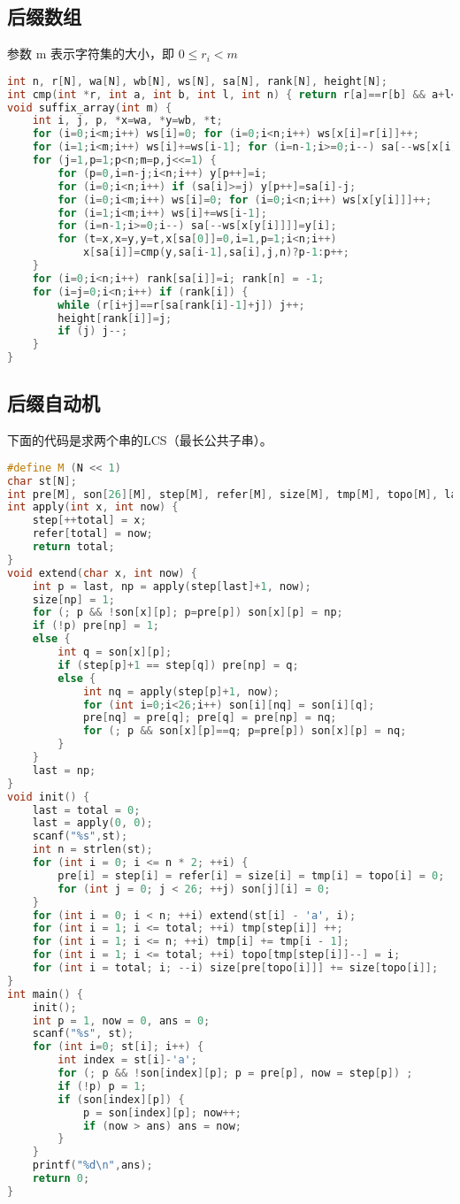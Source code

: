 \documentclass[landscape,a4paper]{article}
\begin{document}
\subsection{后缀数组}
参数 m 表示字符集的大小，即 $0 \leq r_i < m$ 
\begin{lstlisting}[language=C++]
int n, r[N], wa[N], wb[N], ws[N], sa[N], rank[N], height[N];
int cmp(int *r, int a, int b, int l, int n) { return r[a]==r[b] && a+l<n && b+l<n && r[a+l]==r[b+l]; }
void suffix_array(int m) {
	int i, j, p, *x=wa, *y=wb, *t;
	for (i=0;i<m;i++) ws[i]=0; for (i=0;i<n;i++) ws[x[i]=r[i]]++;
	for (i=1;i<m;i++) ws[i]+=ws[i-1]; for (i=n-1;i>=0;i--) sa[--ws[x[i]]]=i;
	for (j=1,p=1;p<n;m=p,j<<=1) {
		for (p=0,i=n-j;i<n;i++) y[p++]=i;
		for (i=0;i<n;i++) if (sa[i]>=j) y[p++]=sa[i]-j;
		for (i=0;i<m;i++) ws[i]=0; for (i=0;i<n;i++) ws[x[y[i]]]++;
		for (i=1;i<m;i++) ws[i]+=ws[i-1];
		for (i=n-1;i>=0;i--) sa[--ws[x[y[i]]]]=y[i];
		for (t=x,x=y,y=t,x[sa[0]]=0,i=1,p=1;i<n;i++)
			x[sa[i]]=cmp(y,sa[i-1],sa[i],j,n)?p-1:p++;
	}
	for (i=0;i<n;i++) rank[sa[i]]=i; rank[n] = -1;
	for (i=j=0;i<n;i++) if (rank[i]) {
		while (r[i+j]==r[sa[rank[i]-1]+j]) j++; 
		height[rank[i]]=j;
		if (j) j--; 
	}
}
\end{lstlisting}
\subsection{后缀自动机}
下面的代码是求两个串的LCS（最长公共子串）。
\begin{lstlisting}[language=C++]
#define M (N << 1)
char st[N];
int pre[M], son[26][M], step[M], refer[M], size[M], tmp[M], topo[M], last, total;
int apply(int x, int now) {
	step[++total] = x;
	refer[total] = now;
	return total;
}
void extend(char x, int now) {
	int p = last, np = apply(step[last]+1, now);
	size[np] = 1;
	for (; p && !son[x][p]; p=pre[p]) son[x][p] = np;
	if (!p) pre[np] = 1;
	else {
		int q = son[x][p];
		if (step[p]+1 == step[q]) pre[np] = q;
		else {
			int nq = apply(step[p]+1, now);
			for (int i=0;i<26;i++) son[i][nq] = son[i][q];
			pre[nq] = pre[q]; pre[q] = pre[np] = nq;
			for (; p && son[x][p]==q; p=pre[p]) son[x][p] = nq;
		}
	}
	last = np;
}
void init() {
	last = total = 0;
	last = apply(0, 0);
	scanf("%s",st);
	int n = strlen(st);
	for (int i = 0; i <= n * 2; ++i) {
		pre[i] = step[i] = refer[i] = size[i] = tmp[i] = topo[i] = 0;
		for (int j = 0; j < 26; ++j) son[j][i] = 0;
	}
	for (int i = 0; i < n; ++i) extend(st[i] - 'a', i);
	for (int i = 1; i <= total; ++i) tmp[step[i]] ++;
	for (int i = 1; i <= n; ++i) tmp[i] += tmp[i - 1];
	for (int i = 1; i <= total; ++i) topo[tmp[step[i]]--] = i;
	for (int i = total; i; --i) size[pre[topo[i]]] += size[topo[i]];
}
int main() {
	init();
	int p = 1, now = 0, ans = 0;
	scanf("%s", st);
	for (int i=0; st[i]; i++) {
		int index = st[i]-'a';
		for (; p && !son[index][p]; p = pre[p], now = step[p]) ;
		if (!p) p = 1;
		if (son[index][p]) {
			p = son[index][p]; now++;
			if (now > ans) ans = now;
		}
	}
	printf("%d\n",ans);
	return 0;
}
\end{lstlisting}
\end{document}
